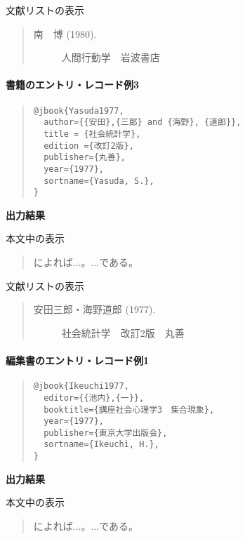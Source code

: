 \documentclass[12pt]{ltjsarticle}
\begin{document}
文献リストの表示
\begin{quote}
\begin{description}
  \item[\textrm{南　博 (1980).}]人間行動学　岩波書店
\end{description}
\end{quote}


\paragraph{書籍のエントリ・レコード例3}
\begin{quote}
\begin{verbatim}
@jbook{Yasuda1977,
  author={{安田},{三郎} and {海野}, {道郎}},
  title = {社会統計学},
  edition ={改訂2版},
  publisher={丸善},
  year={1977},
  sortname={Yasuda, S.},
}
\end{verbatim}
\end{quote}


\textbf{出力結果}

本文中の表示
\begin{quote}
\textcite{Yasuda1977}によれば...。...である\parencite{Yasuda1977}。
\end{quote}


文献リストの表示
\begin{quote}
\begin{description}
  \item[\textrm{安田三郎・海野道郎 (1977).}]社会統計学　改訂2版　丸善
\end{description}
\end{quote}


\paragraph{編集書のエントリ・レコード例1}


\begin{quote}
\begin{verbatim}
@jbook{Ikeuchi1977,
  editor={{池内},{一}},
  booktitle={講座社会心理学3　集合現象},
  year={1977},
  publisher={東京大学出版会},
  sortname={Ikeuchi, H.},
}
\end{verbatim}
\end{quote}


\textbf{出力結果}

本文中の表示
\begin{quote}
\textcite{Ikeuchi1977}によれば...。...である\parencite{Ikeuchi1977}。
\end{quote}
\end{document}
